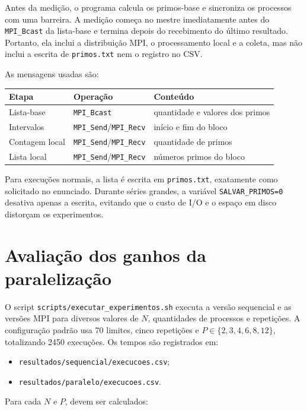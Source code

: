 \documentclass[12pt,a4paper]{article}
\begin{document}
Antes da medição, o programa calcula os primos-base e sincroniza os processos
com uma barreira. A medição começa no mestre imediatamente antes do
\texttt{MPI\_Bcast} da lista-base e termina depois do recebimento do último
resultado. Portanto, ela inclui a distribuição MPI, o processamento local e a
coleta, mas não inclui a escrita de \texttt{primos.txt} nem o registro no CSV.

As mensagens usadas são:

\begin{center}
\begin{tabular}{lll}
\toprule
\textbf{Etapa} & \textbf{Operação} & \textbf{Conteúdo} \\
\midrule
Lista-base & \texttt{MPI\_Bcast} & quantidade e valores dos primos \\
Intervalos & \texttt{MPI\_Send}/\texttt{MPI\_Recv} & início e fim do bloco \\
Contagem local & \texttt{MPI\_Send}/\texttt{MPI\_Recv} & quantidade de primos \\
Lista local & \texttt{MPI\_Send}/\texttt{MPI\_Recv} & números primos do bloco \\
\bottomrule
\end{tabular}
\end{center}

Para execuções normais, a lista é escrita em
\texttt{primos.txt}, exatamente como solicitado no enunciado. Durante séries grandes, a variável
\texttt{SALVAR\_PRIMOS=0} desativa apenas a escrita, evitando que o custo de
I/O e o espaço em disco distorçam os experimentos.

\section{Avaliação dos ganhos da paralelização}

O script \texttt{scripts/executar\_experimentos.sh} executa a versão
sequencial e as versões MPI para diversos valores de \(N\), quantidades de
processos e repetições. A configuração padrão usa 70 limites, cinco
repetições e \(P\in\{2,3,4,6,8,12\}\), totalizando 2450 execuções. Os tempos
são registrados em:

\begin{itemize}
  \item \texttt{resultados/sequencial/execucoes.csv};
  \item \texttt{resultados/paralelo/execucoes.csv}.
\end{itemize}

Para cada \(N\) e \(P\), devem ser calculados:
\end{document}
